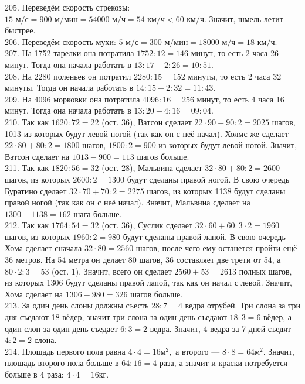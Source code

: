 205. Переведём скорость стрекозы: $15\text{ м/с}=900\text{ м/мин}=54000\text{ м/ч}=54\text{ км/ч}<60\text{ км/ч}.$ Значит, шмель летит быстрее.\\
206. Переведём скорость мухи: $5\text{ м/с}=300\text{ м/мин}=18000\text{ м/ч}=18\text{ км/ч}.$\\
207. На 1752 тарелки она потратила $1752:12=146$ минут, то есть 2 часа 26 минут. Тогда она начала работать в  $13:17-2:26=10:51.$\\
208. На 2280 поленьев он потратил $2280:15=152$ минуты, то есть 2 часа 32 минуты. Тогда он начала работать в  $14:15-2:32=11:43.$\\
209. На 4096 морковки она потратила $4096:16=256$ минут, то есть 4 часа 16 минут. Тогда она начала работать в  $13:20-4:16=09:04.$\\
210. Так как $1620:72=22$ (ост. 36), Ватсон сделает $22\cdot90+90:2=2025$ шагов, 1013 из которых будут левой ногой (так как он с неё начал). Холмс же сделает $22\cdot80+80:2=1800$ шагов, $1800:2=900$ из которых будут левой ногой. Значит, Ватсон сделает на $1013-900=113$ шагов больше.\\
211. Так как $1820:56=32$ (ост. 28), Мальвина сделает $32\cdot80+80:2=2600$ шагов, из которых $2600:2=1300$ будут сделаны правой ногой. В свою очередь Буратино сделает $32\cdot70+70:2=2275$ шагов, из которых 1138 будут сделаны правой ногой (так как он с неё начал). Значит, Мальвина сделает на $1300-1138=162$ шага больше.\\
212. Так как $1764:54=32$ (ост. 36), Суслик сделает $32\cdot60+60:3\cdot2=1960$ шагов, из которых $1960:2=980$ будут сделаны правой лапой. В свою очередь Хома сделает сначала $32\cdot80=2560$ шагов, после чего ему останется пройти ещё 36 метров. На 54 метра он делает 80 шагов, 36 составляет две трети от 54, а  $80\cdot2:3=53$ (ост. 1). Значит, всего он сделает $2560+53=2613$ полных шагов, из которых 1306 будут сделаны правой лапой, так как он начал с левой. Значит, Хома сделает на $1306-980=326$ шагов больше.\\
213. За один день слоны должны съесть $28:7=4$ ведра отрубей. Три слона за три дня съедают 18 вёдер, значит три слона за один день съедают $18:3=6$ вёдер, а один слон за один день съедает $6:3=2$ ведра. Значит, 4 ведра за 7 дней съедят $4:2=2$ слона.\\
214. Площадь первого пола равна $4\cdot4=16\text{м}^2,$ а второго --- $8\cdot8=64\text{м}^2.$ Значит, площадь второго пола больше в $64:16=4$ раза, а значит и краски потребуется больше в $4$ раза: $4\cdot4=16$кг.\\
